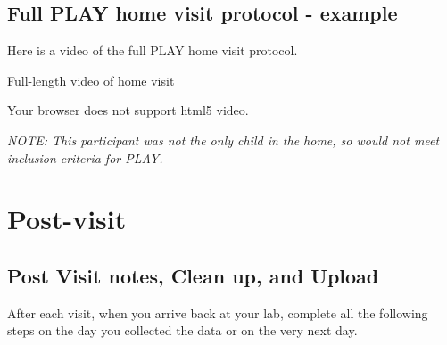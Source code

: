\documentclass[
  12pt,
]{book}
\begin{document}
\hypertarget{full-play-home-visit-protocol---example-1}{%
\section{Full PLAY home visit protocol - example}\label{full-play-home-visit-protocol---example-1}}

Here is a video of the full PLAY home visit protocol.

Full-length video of home visit

\leavevmode{}%
Your browser does not support html5 video.

\emph{NOTE: This participant was not the only child in the home, so would not meet inclusion criteria for PLAY.}

\hypertarget{post-visit}{%
\chapter{Post-visit}\label{post-visit}}

\hypertarget{post-visit-notes-clean-up-and-upload}{%
\section{Post Visit notes, Clean up, and Upload}\label{post-visit-notes-clean-up-and-upload}}

After each visit, when you arrive back at your lab, complete all the following steps on the day you collected the data or on the very next day.
\end{document}
